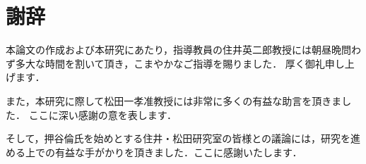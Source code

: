 \documentclass[english]{sumiilab-paper}
\begin{document}
\chapter*{謝辞}
本論文の作成および本研究にあたり，指導教員の住井英二郎教授には朝昼晩問わず多大な時間を割いて頂き，こまやかなご指導を賜りました．
厚く御礼申し上げます．

また，本研究に際して松田一孝准教授には非常に多くの有益な助言を頂きました．
ここに深い感謝の意を表します．

そして，押谷倫氏を始めとする住井・松田研究室の皆様との議論には，研究を進める上での有益な手がかりを頂きました．ここに感謝いたします．
%


%
\end{document}
